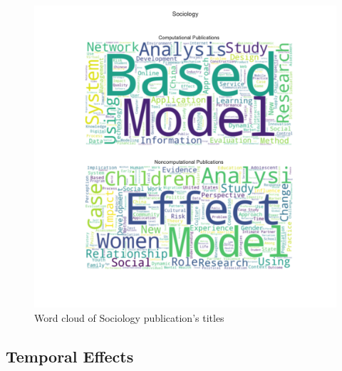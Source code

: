 \documentclass[12pt, a4paper]{article}
\begin{document}
\begin{figure}[H]
	\centering
	\includegraphics[width=\textwidth]{wc_Sociology}
	\caption{Word cloud of Sociology publication's titles}\label{wc}
\end{figure}

\subsection{Temporal Effects}
\end{document}
